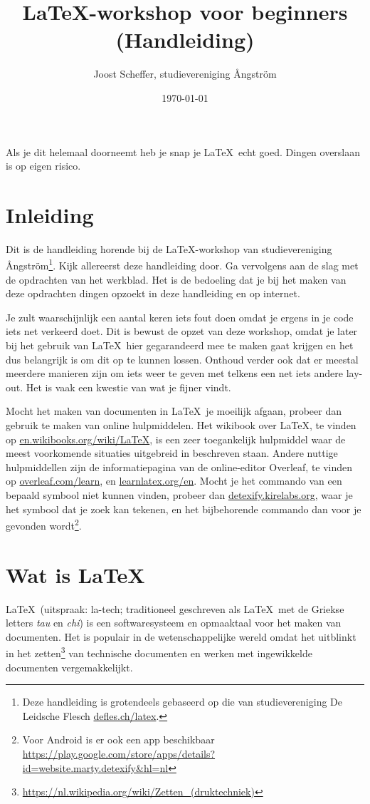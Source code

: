 \documentclass[dutch]{article}
\title{\LaTeX-workshop voor beginners (Handleiding)}
\author{Joost Scheffer, studievereniging Ångström}
\date{\today}
\begin{document}
\maketitle

Als je dit helemaal doorneemt heb je snap je \LaTeX\ echt goed. Dingen overslaan is op eigen risico.
\section{Inleiding}
Dit is de handleiding horende bij de \LaTeX-workshop van studievereniging Ångström\footnote{Deze handleiding is grotendeels gebaseerd op die van studievereniging De Leidsche Flesch \href{https://www.deleidscheflesch.nl/p/latex-workshop}{defles.ch/latex}.}.
Kijk allereerst deze handleiding door.
Ga vervolgens aan de slag met de opdrachten van het werkblad.
Het is de bedoeling dat je bij het maken van deze opdrachten dingen opzoekt in deze handleiding en op internet.

Je zult waarschijnlijk een aantal keren iets fout doen omdat je ergens in je code iets net verkeerd doet.
Dit is bewust de opzet van deze workshop, omdat je later bij het gebruik van \LaTeX\ hier gegarandeerd mee te maken gaat krijgen en het dus belangrijk is om dit op te kunnen lossen.
Onthoud verder ook dat er meestal meerdere manieren zijn om iets weer te geven met telkens een net iets andere lay-out.
Het is vaak een kwestie van wat je fijner vindt.

Mocht het maken van documenten in \LaTeX\ je moeilijk afgaan, probeer dan gebruik te maken van online hulpmiddelen.
Het wikibook over \LaTeX, te vinden op \href{https://en.wikibooks.org/wiki/LaTeX}{en.wikibooks.org/wiki/LaTeX}, is een zeer toegankelijk hulpmiddel waar de meest voorkomende situaties uitgebreid in beschreven staan.
Andere nuttige hulpmiddellen zijn de informatiepagina van de online-editor Overleaf, te vinden op \href{https://www.overleaf.com/learn}{overleaf.com/learn}, en \href{https://www.learnlatex.org/en/}{learnlatex.org/en}.
Mocht je het commando van een bepaald symbool niet kunnen vinden, probeer dan \href{http://detexify.kirelabs.org}{detexify.kirelabs.org}, waar je het symbool dat je zoek kan tekenen, en het bijbehorende commando dan voor je gevonden wordt\footnote{Voor Android is er ook een app beschikbaar \url{https://play.google.com/store/apps/details?id=website.marty.detexify&hl=nl} }.


\section{Wat is \LaTeX}
LaTeX\ (uitspraak: la-tech; traditioneel geschreven als \LaTeX\ met de Griekse letters \textit{tau} en \textit{chi}) is een softwaresysteem en opmaaktaal voor het maken van documenten.
Het is populair in de wetenschappelijke wereld omdat het uitblinkt in het zetten\footnote{\url{https://nl.wikipedia.org/wiki/Zetten_(druktechniek)}} van technische documenten en werken met ingewikkelde documenten vergemakkelijkt.
\end{document}
